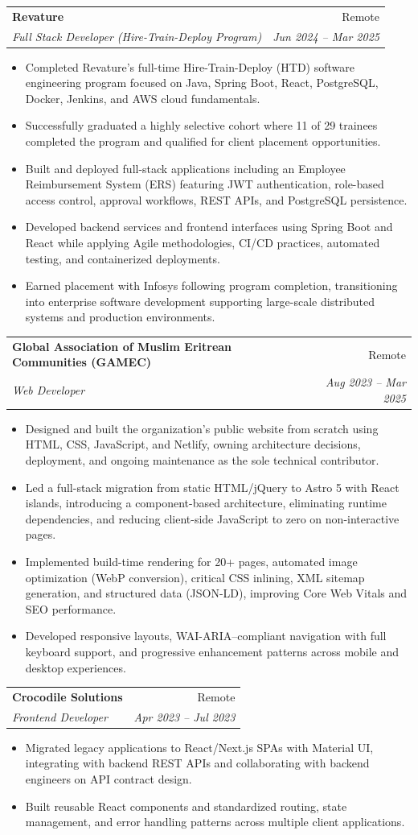 \documentclass[letterpaper,12pt]{article}
\makeatletter
\newcommand{\resumeItem}[1]{
  \item\small{
    #1 \vspace{-2pt}
  }
}
\newcommand{\resumeSubheading}[4]{
  \needspace{6\baselineskip}%
  \vspace{-2pt}\item
    \begin{tabular*}{0.97\textwidth}[t]{l@{\extracolsep{\fill}}r}
      \textbf{#1} & #2 \\
      \textit{\small#3} & \textit{\small #4} \\
    \end{tabular*}\vspace{-7pt}
}
\newcommand{\resumeItemListStart}{\begin{itemize}\samepage}
\newcommand{\resumeItemListEnd}{\end{itemize}\vspace{-5pt}}
\makeatother
\begin{document}
\resumeSubheading
  {Revature}{Remote}
  {Full Stack Developer (Hire-Train-Deploy Program)}{Jun 2024 -- Mar 2025}
  \resumeItemListStart
    \resumeItem{Completed Revature's full-time Hire-Train-Deploy (HTD) software engineering program focused on Java, Spring Boot, React, PostgreSQL, Docker, Jenkins, and AWS cloud fundamentals.}
    \resumeItem{Successfully graduated a highly selective cohort where 11 of 29 trainees completed the program and qualified for client placement opportunities.}
    \resumeItem{Built and deployed full-stack applications including an Employee Reimbursement System (ERS) featuring JWT authentication, role-based access control, approval workflows, REST APIs, and PostgreSQL persistence.}
    \resumeItem{Developed backend services and frontend interfaces using Spring Boot and React while applying Agile methodologies, CI/CD practices, automated testing, and containerized deployments.}
    \resumeItem{Earned placement with Infosys following program completion, transitioning into enterprise software development supporting large-scale distributed systems and production environments.}
  \resumeItemListEnd

    \resumeSubheading{Global Association of Muslim Eritrean Communities (GAMEC)}{Remote}{Web Developer}{Aug 2023 -- Mar 2025}
    \resumeItemListStart
      \resumeItem{Designed and built the organization's public website from scratch using HTML, CSS, JavaScript, and Netlify, owning architecture decisions, deployment, and ongoing maintenance as the sole technical contributor.}
      \resumeItem{Led a full-stack migration from static HTML/jQuery to Astro 5 with React islands, introducing a component-based architecture, eliminating runtime dependencies, and reducing client-side JavaScript to zero on non-interactive pages.}
      \resumeItem{Implemented build-time rendering for 20+ pages, automated image optimization (WebP conversion), critical CSS inlining, XML sitemap generation, and structured data (JSON-LD), improving Core Web Vitals and SEO performance.}
      \resumeItem{Developed responsive layouts, WAI-ARIA–compliant navigation with full keyboard support, and progressive enhancement patterns across mobile and desktop experiences.}
    \resumeItemListEnd


    \resumeSubheading
      {Crocodile Solutions}{Remote}
      {Frontend Developer}{Apr 2023 -- Jul 2023}
      \resumeItemListStart
        \resumeItem{Migrated legacy applications to React/Next.js SPAs with Material UI, integrating with backend REST APIs and collaborating with backend engineers on API contract design.}
        \resumeItem{Built reusable React components and standardized routing, state management, and error handling patterns across multiple client applications.}
      \resumeItemListEnd
\end{document}
